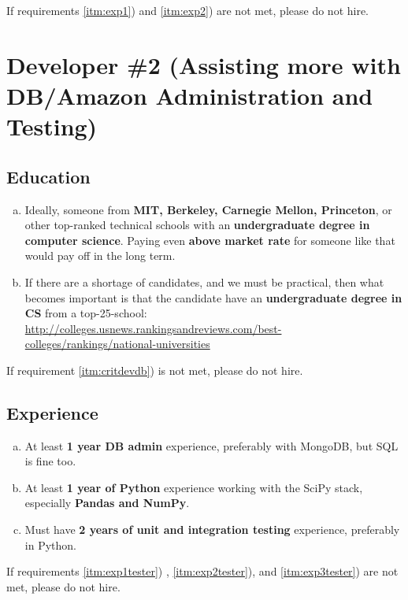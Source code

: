 \documentclass[12pt]{article}
\begin{document}
\begin{framed}
	If requirements \ref{itm:exp1}) and \ref{itm:exp2}) are not met, please do not
	hire.
\end{framed}

\section{Developer \#2 (Assisting more with DB/Amazon Administration and Testing) }
\subsection{Education}
\begin{enumerate}[a)]
	\item
		Ideally, someone from \textbf{MIT, Berkeley, Carnegie Mellon, Princeton}, or other
		top-ranked technical schools with an \textbf{undergraduate degree in
		computer science}. 
		Paying even \textbf{above market rate} for someone like that would pay off in the
		long term. 
	\item\label{itm:critdevdb} If there are a shortage of candidates, and we must be practical, then
		what becomes important is that the candidate have an \textbf{undergraduate
		degree in CS} from a top-25-school: \\
		\href{}{http://colleges.usnews.rankingsandreviews.com/best-colleges/rankings/national-universities}

\end{enumerate}


\begin{framed}
	If requirement \ref{itm:critdevdb}) is not met, please do not hire.
\end{framed}

\subsection{Experience}
\begin{enumerate}[a)]
	\item\label{itm:exp1tester} At least \textbf{1 year DB admin} experience, preferably 
		with MongoDB, but SQL is fine too. 
	\item\label{itm:exp2tester}
		At least \textbf{1 year of Python} experience working with the SciPy stack,
		especially \textbf{Pandas and NumPy}. 
	\item\label{itm:exp3tester} Must have \textbf{2 years of unit and integration
		testing} experience, preferably in Python.
\end{enumerate}

\begin{framed}
	If requirements \ref{itm:exp1tester}) , \ref{itm:exp2tester}), and \ref{itm:exp3tester}) are not met, please do not hire.
\end{framed}
\end{document}
